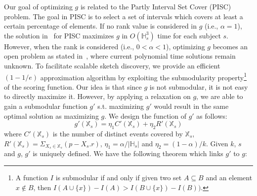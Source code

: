 Our goal of optimizing $g$ is related to the Partly Interval Set Cover (PISC) problem. The goal in PISC is to select a set
of intervals which covers at least a certain percentage of elements. If no rank value is considered in $g$ (i.e., $\alpha = 1$), the
solution in~\cite{golab2009sequential} for PISC maximizes $g$ in $O(\mathbb{H}_s^3)$ time for each subject $s$. However, when
the rank is considered (i.e., $0< \alpha < 1$), optimizing $g$ becomes an open problem as stated in~\cite{edwards2013partial}, where current polynomial time solutions remain unknown.
%
To facilitate scalable sketch discovery, we provide 
an efficient $(1-1/e)$ approximation algorithm by exploiting the submodularity property\footnote{A function $I$ is submodular if and only if given two set $A \subseteq B$ and
an element $x \not\in B$, then $I(A \cup \{x\}) - I(A) > I(B \cup \{x\}) - I(B))$.} of the scoring function. Our idea is that since $g$ is not submodular, it is not easy to directly maximize it. However, by applying a relaxation on $g$, we are able
to gain a submodular function $g'$ s.t. maximizing $g'$ would result in
the same optimal solution as maximizing $g$. We design the function of $g'$ as follows:
\begin{equation}
\label{eq:gscore}
g'(\mathbb{X}_s) = \eta_1C'(\mathbb{X}_s) + \eta_2R'(\mathbb{X}_s)
\end{equation}
where $C'(\mathbb{X}_s)$ is the number of distinct events covered by $\mathbb{X}_s$,
 $R'(\mathbb{X}_s) = \Sigma_{X_s \in \mathbb{X}_s}(p-X_s.r)$, $\eta_1 = \alpha/|\mathbb{H}_s|$
and $\eta_2 = (1-\alpha)/k$. Given $k$, $s$ and $g$,
$g'$ is uniquely defined. We have the following theorem which links $g'$ to $g$:

